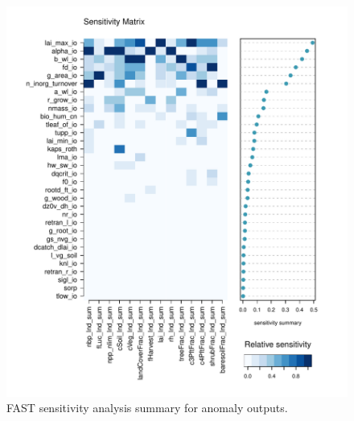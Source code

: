 \documentclass[gmd, manuscript]{copernicus}
\begin{document}
\begin{figure}[t]
\includegraphics[width=12cm]{./figs/figA06.pdf}
\caption{FAST sensitivity analysis summary for anomaly outputs.}
\label{fig:FAST_sensmat_YAnom_level1a}
\end{figure}



\noappendix       %




\end{document}
